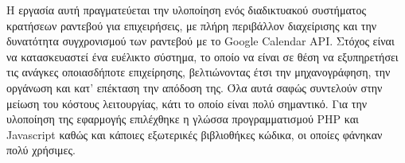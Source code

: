 
\Titlepage
\Declarationpage

\begin{Abstract}
Η εργασία αυτή πραγματεύεται την υλοποίηση ενός διαδικτυακού συστήματος κρατήσεων ραντεβού για επιχειρήσεις, με πλήρη περιβάλλον διαχείρισης και την δυνατότητα συγχρονισμού των ραντεβού με το Google Calendar API. Στόχος είναι να κατασκευαστεί ένα ευέλικτο σύστημα, το οποίο να είναι σε θέση να εξυπηρετήσει τις ανάγκες οποιασδήποτε επιχείρησης, βελτιώνοντας έτσι την μηχανογράφηση, την οργάνωση και κατ' επέκταση την απόδοση της. Όλα αυτά σαφώς συντελούν στην μείωση του κόστους λειτουργίας, κάτι το οποίο είναι πολύ σημαντικό. Για την υλοποίηση της εφαρμογής επιλέχθηκε η γλώσσα προγραμματισμού PHP και Javascript καθώς και κάποιες εξωτερικές βιβλιοθήκες κώδικα, οι οποίες φάνηκαν πολύ χρήσιμες.
\end{Abstract}

\tableofcontents
\listoffigures

